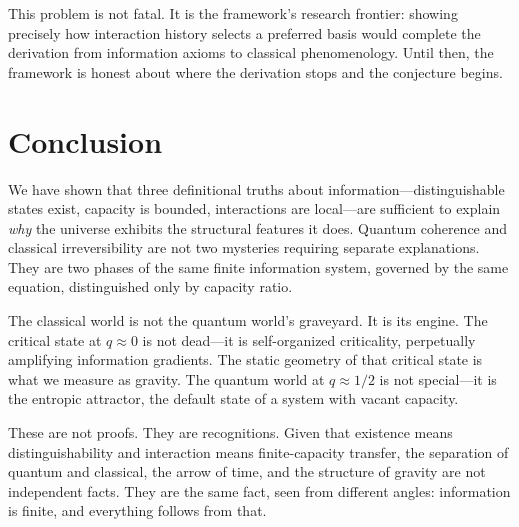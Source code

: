 \documentclass[reprint]{revtex4-2}
\begin{document}
This problem is not fatal. It is the framework's research frontier: showing precisely how interaction history selects a preferred basis would complete the derivation from information axioms to classical phenomenology. Until then, the framework is honest about where the derivation stops and the conjecture begins.

\section{Conclusion}

We have shown that three definitional truths about information---distinguishable states exist, capacity is bounded, interactions are local---are sufficient to explain \emph{why} the universe exhibits the structural features it does. Quantum coherence and classical irreversibility are not two mysteries requiring separate explanations. They are two phases of the same finite information system, governed by the same equation, distinguished only by capacity ratio.

The classical world is not the quantum world's graveyard. It is its engine. The critical state at $q\approx 0$ is not dead---it is self-organized criticality, perpetually amplifying information gradients. The static geometry of that critical state is what we measure as gravity. The quantum world at $q\approx 1/2$ is not special---it is the entropic attractor, the default state of a system with vacant capacity.

These are not proofs. They are recognitions. Given that existence means distinguishability and interaction means finite-capacity transfer, the separation of quantum and classical, the arrow of time, and the structure of gravity are not independent facts. They are the same fact, seen from different angles: information is finite, and everything follows from that.
\end{document}

